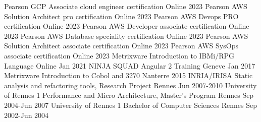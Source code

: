 
\begin{cventries}
\cventry
{Pearson} %
{GCP Associate cloud engineer certification} %
{Online} %
{2023} %
{
}
\cventry
{Pearson} %
{AWS Solution Architect pro certification} %
{Online} %
{2023} %
{
}
\cventry
{Pearson} %
{AWS Devops PRO certification} %
{Online} %
{2023} %
{
}
\cventry
{Pearson} %
{AWS Developer associate certification} %
{Online} %
{2023} %
{
}
\cventry
{Pearson} %
{AWS Database speciality certification} %
{Online} %
{2023} %
{
}
\cventry
{Pearson} %
{AWS Solution Architect associate certification} %
{Online} %
{2023} %
{
}
\cventry
{Pearson} %
{AWS SysOps associate certification} %
{Online} %
{2023} %
{
}
\cventry
{Metrixware} %
{Introduction to IBMi/RPG Language} %
{Online} %
{Jan 2021} %
{
}
\cventry
{NINJA SQUAD} %
{Angular 2 Training} %
{Geneve} %
{Jan 2017} %
{
}
\cventry
{Metrixware} %
{Introduction to Cobol and 3270} %
{Nanterre} %
{2015} %
{
}
\cventry
{INRIA/IRISA} %
{Static analysis and refactoring tools, Research Project} %
{Rennes} %
{Jun 2007-2010} %
{
}
\cventry
{University of Rennes 1} %
{Performance and Micro Architecture, Master's Program} %
{Rennes} %
{Sep 2004-Jun 2007} %
{
}
\cventry
{University of Rennes 1} %
{Bachelor of Computer Sciences} %
{Rennes} %
{Sep 2002-Jun 2004} %
{
}
\end{cventries}
